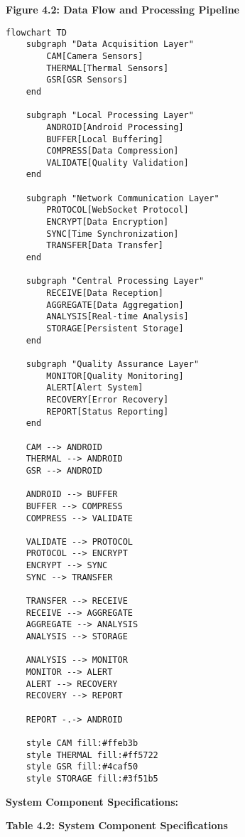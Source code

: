 \documentclass[12pt,a4paper]{article}
\begin{document}
\textbf{Figure 4.2: Data Flow and Processing Pipeline}

\begin{verbatim}
flowchart TD
    subgraph "Data Acquisition Layer"
        CAM[Camera Sensors]
        THERMAL[Thermal Sensors] 
        GSR[GSR Sensors]
    end
    
    subgraph "Local Processing Layer"
        ANDROID[Android Processing]
        BUFFER[Local Buffering]
        COMPRESS[Data Compression]
        VALIDATE[Quality Validation]
    end
    
    subgraph "Network Communication Layer"
        PROTOCOL[WebSocket Protocol]
        ENCRYPT[Data Encryption]
        SYNC[Time Synchronization]
        TRANSFER[Data Transfer]
    end
    
    subgraph "Central Processing Layer"
        RECEIVE[Data Reception]
        AGGREGATE[Data Aggregation]
        ANALYSIS[Real-time Analysis]
        STORAGE[Persistent Storage]
    end
    
    subgraph "Quality Assurance Layer"
        MONITOR[Quality Monitoring]
        ALERT[Alert System]
        RECOVERY[Error Recovery]
        REPORT[Status Reporting]
    end
    
    CAM --> ANDROID
    THERMAL --> ANDROID
    GSR --> ANDROID
    
    ANDROID --> BUFFER
    BUFFER --> COMPRESS
    COMPRESS --> VALIDATE
    
    VALIDATE --> PROTOCOL
    PROTOCOL --> ENCRYPT
    ENCRYPT --> SYNC
    SYNC --> TRANSFER
    
    TRANSFER --> RECEIVE
    RECEIVE --> AGGREGATE
    AGGREGATE --> ANALYSIS
    ANALYSIS --> STORAGE
    
    ANALYSIS --> MONITOR
    MONITOR --> ALERT
    ALERT --> RECOVERY
    RECOVERY --> REPORT
    
    REPORT -.-> ANDROID
    
    style CAM fill:#ffeb3b
    style THERMAL fill:#ff5722
    style GSR fill:#4caf50
    style STORAGE fill:#3f51b5
\end{verbatim}

\textbf{System Component Specifications:}

\textbf{Table 4.2: System Component Specifications}
\end{document}
